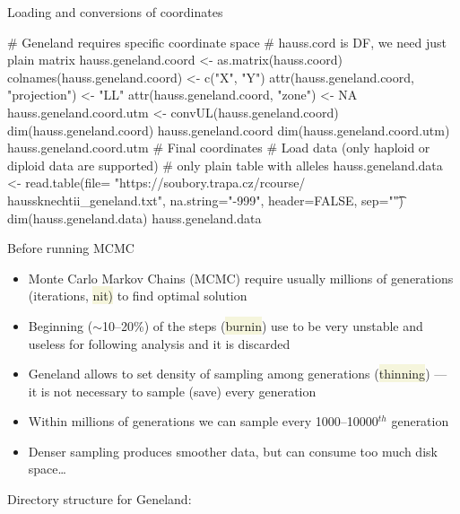 \documentclass[compress, ucs, xelatex, 11pt, xcolor=svgnames, aspectratio=169,
	hyperref={
		bookmarks=true,
		unicode=true,
		colorlinks=true,
		pdftitle={Molecular data in R},
		plainpages=false,
		pdfauthor={Vojtech Zeisek},
		pdfsubject={Course about phylogeny and evolution in R},
		pdfcreator={XeLaTeX},
		pdfkeywords={R, evolution, phylogeny, molecular data},
		linkcolor=Crimson, %
		anchorcolor=Magenta, %
		citecolor=Magenta, %
		filecolor=Magenta, %
		menucolor=Magenta, %
		urlcolor=DodgerBlue, %
		pdftex},
	url={hyphens, lowtilde} %
	]{beamer}
\renewcommand{\texttt}[1]{\colorbox{Beige}{{\ttfamily #1}}}
\begin{document}
\begin{frame}[fragile]{Loading and conversions of coordinates}
	\begin{spluscode}
    # Geneland requires specific coordinate space
    # hauss.cord is DF, we need just plain matrix
    hauss.geneland.coord <- as.matrix(hauss.coord)
    colnames(hauss.geneland.coord) <- c("X", "Y")
    attr(hauss.geneland.coord, "projection") <- "LL"
    attr(hauss.geneland.coord, "zone") <- NA
    hauss.geneland.coord.utm <- convUL(hauss.geneland.coord)
    dim(hauss.geneland.coord)
    hauss.geneland.coord
    dim(hauss.geneland.coord.utm)
    hauss.geneland.coord.utm # Final coordinates
    # Load data (only haploid or diploid data are supported)
    # only plain table with alleles
    hauss.geneland.data <- read.table(file= "https://soubory.trapa.cz/rcourse/
      haussknechtii_geneland.txt", na.string="-999", header=FALSE, sep="\t")
    dim(hauss.geneland.data)
    hauss.geneland.data
	\end{spluscode}
\end{frame}

\begin{frame}{Before running MCMC}
	\begin{multicols}{2}
		\begin{itemize}
			\item Monte Carlo Markov Chains (MCMC) require usually millions of generations (iterations, \texttt{nit)} to find optimal solution
			\item Beginning ($\sim$10--20\%) of the steps (\texttt{burnin}) use to be very unstable and useless for following analysis and it is discarded
			\item Geneland allows to set density of sampling among generations (\texttt{thinning}) --- it is not necessary to sample (save) every generation
			\item Within millions of generations we can sample every 1000--10000$^{th}$ generation
			\item Denser sampling produces smoother data, but can consume too much disk space\ldots
		\end{itemize}
		\vfill
		Directory structure for Geneland:
		\vfill
		\begin{center}
			\texttt{[image: genelad\_dirs.png]}
		\end{center}
		\vfil
	\end{multicols}
\end{frame}
\end{document}
